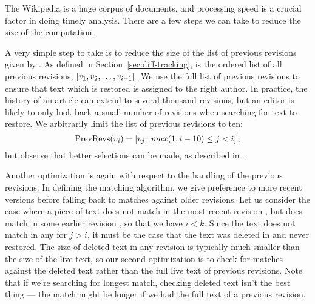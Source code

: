 The Wikipedia is a huge corpus of documents, and processing speed
is a crucial factor in doing timely analysis.
There are a few steps we can take to reduce the size of the computation.

A very simple step to take is to reduce the size of the list of
previous revisions given by .
As defined in Section~\ref{sec:diff-tracking},  
is the ordered list of all previous revisions,
$\left[ v_{1}, v_{2}, \ldots, v_{i-1} \right]$.
We use the full list of previous revisions to ensure that text which
is restored is assigned to the right author.
In practice, the history of an article can extend to several thousand
revisions, but an editor is likely to only look back a small number
of revisions when searching for text to restore.
We arbitrarily limit the list of previous revisions to ten:
\begin{equation*}
    \mathrm{PrevRevs}(v_{i}) = \left[ v_{j} \colon
	max(1,i-10) \le j < i \right],
\end{equation*}
but observe that better selections can be made, as described
in~\cite{Chatterjee2008}.

Another optimization is again with respect to the handling of the
previous revisions.
In defining the matching algorithm, we give preference to more recent
versions before falling back to matches against older revisions.
Let us consider the case where a piece of text does not match in the
most recent revision ,
but does match in some earlier revision , so that we have $i < k$.
Since the text does not match in any  for $j > i$,
it must be the case that the text was deleted in  and
never restored.
The size of deleted text in any revision is typically much smaller
than the size of the live text, so our second optimization is
to check for matches against the deleted text rather than the full
live text of previous revisions.
Note that if we're searching for longest match, checking deleted
text isn't the best thing --- the match might be longer if we
had the full text of a previous revision.

